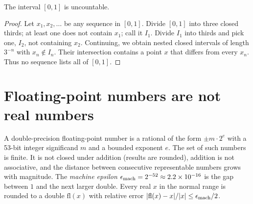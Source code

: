 \begin{theorem}[Cantor]
The interval $[0,1]$ is uncountable.
\end{theorem}
\begin{proof}
Let $x_1,x_2,\ldots$ be any sequence in $[0,1]$. Divide $[0,1]$ into three closed thirds; at least one does not contain $x_1$; call it $I_1$. Divide $I_1$ into thirds and pick one, $I_2$, not containing $x_2$. Continuing, we obtain nested closed intervals of length $3^{-n}$ with $x_n\notin I_n$. Their intersection contains a point $x$ that differs from every $x_n$. Thus no sequence lists all of $[0,1]$.
\end{proof}

\section{Floating-point numbers are not real numbers}
A double-precision floating-point number is a rational of the form $\pm m\cdot2^{e}$ with a 53-bit integer significand $m$ and a bounded exponent $e$. The set of such numbers is finite. It is not closed under addition (results are rounded), addition is not associative, and the distance between consecutive representable numbers grows with magnitude. The \emph{machine epsilon} $\epsilon_{\rm mach}=2^{-52}\approx2.2\times10^{-16}$ is the gap between $1$ and the next larger double. Every real $x$ in the normal range is rounded to a double $\mathrm{fl}(x)$ with relative error $|\mathrm{fl}(x)-x|/|x|\le\epsilon_{\rm mach}/2$.

